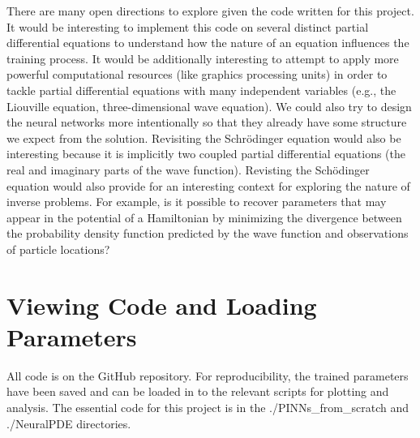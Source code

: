 \documentclass[11pt]{article}
\newcommand{\1}{\mathbf 1}
\begin{document}
There are many open directions to explore given the code written for this project.
It would be interesting to implement this code on several distinct partial differential equations to understand how the nature of an equation influences the training process.
It would be additionally interesting to attempt to apply more powerful computational resources (like graphics processing units) in order to tackle partial differential equations with many independent variables (e.g., the Liouville equation, three-dimensional wave equation).
We could also try to design the neural networks more intentionally so that they already have some structure we expect from the solution.
Revisiting the Schr\"odinger equation would also be interesting because it is implicitly two coupled partial differential equations (the real and imaginary parts of the wave function).
Revisting the Sch\"odinger equation would also provide for an interesting context for exploring the nature of inverse problems.
For example, is it possible to recover parameters that may appear in the potential of a Hamiltonian by minimizing the divergence between the probability density function predicted by the wave function and observations of particle locations?

\appendix
\section{Viewing Code and Loading Parameters}

All code is on the GitHub repository.
For reproducibility, the trained parameters have been saved and can be loaded in to the relevant scripts for plotting and analysis.
The essential code for this project is in the ./PINNs\_from\_scratch and ./NeuralPDE directories.
\end{document}
